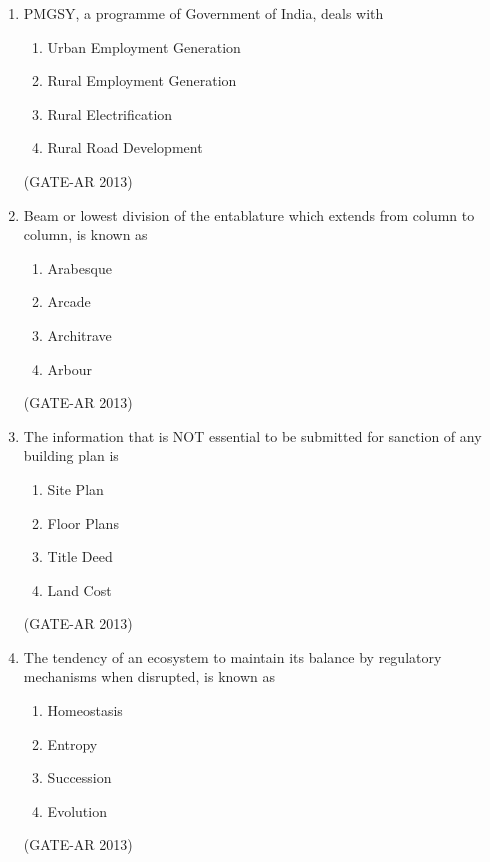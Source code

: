 \documentclass[a4paper,10pt]{article}
\begin{document}
\begin{enumerate}
    \item PMGSY, a programme of Government of India, deals with 
    \begin{multicols}{2}
    \begin{enumerate}
        \item Urban Employment Generation
        \item Rural Employment Generation
        \item Rural Electrification
        \item Rural Road Development
    \end{enumerate}
    \end{multicols}
    \hfill (GATE-AR 2013)
    
    \item Beam or lowest division of the entablature which extends from column to column, is known as 
    \begin{multicols}{4}
	\begin{enumerate}
        \item Arabesque
        \item Arcade
        \item Architrave
        \item Arbour
    \end{enumerate}
	\end{multicols}
    \hfill (GATE-AR 2013)
    
    \item The information that is NOT essential to be submitted for sanction of any building plan is 
    \begin{multicols}{4}
	\begin{enumerate}
        \item Site Plan
        \item Floor Plans
        \item Title Deed
        \item Land Cost
    \end{enumerate}
	\end{multicols}
    \hfill (GATE-AR 2013)
    
    \item The tendency of an ecosystem to maintain its balance by regulatory mechanisms when disrupted, is known as 
    \begin{multicols}{4}
	\begin{enumerate}
        \item Homeostasis
        \item Entropy
        \item Succession
        \item Evolution
    \end{enumerate}
	\end{multicols}
    \hfill (GATE-AR 2013)
    

\end{enumerate}
\end{document}

